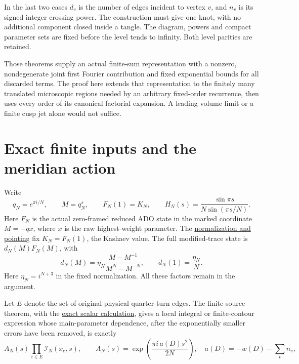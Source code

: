 In the last two cases \(d_v\) is the number of edges incident to vertex \(v\), and \(n_v\) is its signed integer crossing power. The construction must give one knot, with no additional component closed inside a tangle. The diagram, powers and compact parameter sets are fixed before the level tends to infinity. Both level parities are retained.

Those theorems supply an actual finite-sum representation with a nonzero, nondegenerate joint first Fourier contribution and fixed exponential bounds for all discarded terms. The proof here extends that representation to the finitely many translated microscopic regions needed by an arbitrary fixed-order recurrence, then uses every order of its canonical factorial expansion. A leading volume limit or a finite cusp jet alone would not suffice.

\section{Exact finite inputs and the meridian action}\label{fc:sec-1}

Write
\begin{equation}\label{fc:eq-1}
q_N=e^{\pi i/N},\qquad M=q_N^s,\qquad
 F_N(1)=K_N,\qquad
 H_N(s)=\frac{\sin\pi s}{N\sin(\pi s/N)}.
\end{equation}
 Here \(F_N\) is the actual zero-framed reduced ADO state in the marked coordinate \(M=-qx\), where \(x\) is the raw highest-weight parameter. The \href{https://sashakolpakov.github.io/murakamis_dream/notes/kashaev_ado_pointing.html}{normalization and pointing} fix \(K_N=F_N(1)\), the Kashaev value. The full modified-trace state is \(d_N(M)F_N(M)\), with
\begin{equation}\label{fc:eq-2}
d_N(M)=\eta_N\frac{M-M^{-1}}{M^N-M^{-N}},\qquad
 d_N(1)=\frac{\eta_N}{N}.
\end{equation}
 Here \(\eta_N=i^{N+3}\) in the fixed normalization. All these factors remain in the argument.

Let \(E\) denote the set of original physical quarter-turn edges.
The finite-source theorem, with the \href{https://sashakolpakov.github.io/murakamis_dream/notes/actual_main_meridian_exact_scalar.html}{exact scalar calculation}, gives a local integral or finite-contour expression whose main-parameter dependence, after the exponentially smaller errors have been removed, is exactly
\begin{equation}\label{fc:eq-3}
A_N(s)\prod_{e\in E}\mathcal I_N(x_e,s),\qquad
 A_N(s)=\exp\!\left(\frac{\pi i\,a(D)s^2}{2N}\right),
 \quad a(D)=-w(D)-\sum_v n_v,
\end{equation}

